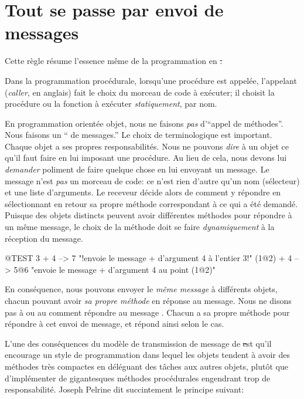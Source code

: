 \documentclass[a4paper,10pt,twoside]{book}
\begin{document}
\section{Tout se passe par envoi de messages}


Cette r\`egle r\'esume l'essence m\^eme de la programmation en \st.

Dans la programmation proc\'edurale, lorsqu'une proc\'edure est appel\'ee, l'appelant (\emph{caller}, en anglais) fait le choix du morceau de code \`a ex\'ecuter; il choisit la proc\'edure ou la fonction \`a ex\'ecuter \emph{statiquement}, par nom.  

En programmation orient\'ee objet, nous ne faisons \emph{pas} d'``appel de m\'ethodes''. Nous faisons un `` de messages.''
Le choix de terminologique est important.
Chaque objet a ses propres responsabilit\'es.
Nous ne pouvons \emph{dire} \`a un objet ce qu'il faut faire en lui imposant 
une proc\'edure.
Au lieu de cela, nous devons lui \emph{demander} poliment de faire quelque chose en lui envoyant un message.
Le message n'est \emph{pas} un morceau de code: ce n'est rien d'autre qu'un nom (s\'electeur) et une liste d'arguments.
Le receveur d\'ecide alors de comment y r\'epondre en s\'electionnant en retour
sa propre m\'ethode correspondant \`a ce qui a \'et\'e demand\'e.
Puisque des objets distincts peuvent avoir diff\'erentes m\'ethodes pour r\'epondre \`a un m\^eme message, le choix de la m\'ethode doit se faire \emph{dynamiquement} \`a la r\'eception du message.
\begin{code}{@TEST}
3 + 4         --> 7          "!envoie le message + d'argument 4 \`a l'entier  3!"
(1@2) + 4 --> 5@6    "envoie le message + d'argument 4 au point (1@2)"
\end{code}
\noindent
En cons\'equence, nous pouvons envoyer le \emph{m\^eme message} \`a diff\'erents objets, chacun pouvant avoir \emph{sa propre m\'ethode} en r\'eponse au message.
Nous ne disons pas \`a   ou au   comment r\'epondre au message .
Chacun a sa propre m\'ethode pour r\'epondre \`a cet envoi de message, et r\'epond ainsi selon le cas.

L'une des cons\'equences du mod\`ele de transmission de message de \st est qu'il encourage un style de programmation dans lequel les objets tendent \`a avoir des m\'ethodes tr\`es compactes en d\'el\'eguant des t\^aches aux autres objets, plut\^ot que d'impl\'ementer de gigantesques m\'ethodes proc\'edurales engendrant trop de responsabilit\'e.
Joseph Pelrine
dit succintement le principe suivant:
\end{document}
